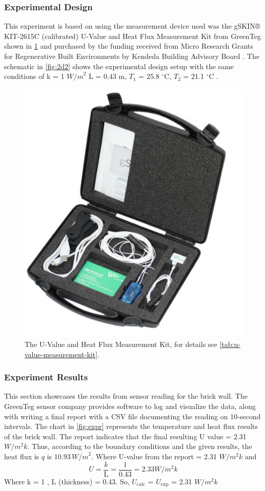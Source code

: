 



 
\subsubsection{Experimental Design}
 This experiment is based on using the measurement device used was the gSKIN® KIT-2615C (calibrated) U-Value and Heat Flux Measurement Kit from GreenTeg  \cite{greenteg} shown in \ref{fig:toolkit} and purchased by the funding received from Micro Research Grants for Regenerative Built Environments by  Kendeda Building Advisory Board \cite{kendeda}.
 The schematic in \cref{fig:2d2} shows the experimental design setup with the same conditions of k  = 1 ${W/m}^2$ 
L  = 0.43 m,
$T_1$ = 25.8 $^\circ \text{C}$, 
$T_2$  = 21.1  $^\circ \text{C}$ .

\begin{figure}[tbh]
     \centering
    \includegraphics[width=0.5\linewidth]{Figures/greenteg.png}
     \caption[U-value measurement Kit]{The U-Value and Heat Flux Measurement Kit, for details see \cref{tab:u-value-measurement-kit}.}
   \label{fig:toolkit}
 \end{figure}






\subsubsection{Experiment Results}
This section showcases the results from sensor reading for the brick wall. The GreenTeg sensor company provides software to log and visualize the data, along with writing a final report with a CSV file documenting the reading on 10-second intervals. The chart in \ref{fig:expr} represents the temperature and heat flux results of the brick wall. 
The report indicates that the final resulting U value = 2.31 ${W/m^2k}$. Thus, according to the boundary conditions and the given results, the heat flux is \( q \) is \( 10.93 \, {W/m}^2 \). 
Where U-value from the report = 2.31 ${W/m^2k}$ and 
\begin{equation}
    U = \frac{k}{\text{L}}
      = \frac{1}{\text{0.43}} = 2.33  {W/m^2k}
\end{equation}
Where k = 1 , L (thickness) = 0.43. So, \(U_{\text{calc}}\) = \(U_{\text{exp}}\) = 2.31 ${W/m^2k}$ 

